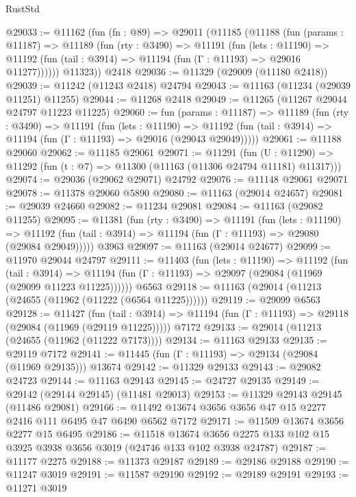 \begin{lexlean}{RustStd}
\begin{coremodule}
@29033 := @11162
    (fun (fn : @89) =>
    @29011
      (@11185
        (@11188
          (fun (params : @11187) =>
          @11189
            (fun (rty : @3490) =>
            @11191
              (fun (lets : @11190) =>
              @11192 (fun (tail : @3914) => @11194 (fun (Γ : @11193) => @29016 @11277))))))
        @11323))
    @2418
@29036 := @11329 (@29009 (@11180 @2418))
@29039 := @11242 (@11243 @2418) @24794
@29043 := @11163 (@11234 (@29039 @11251) @11255)
@29044 := @11268 @2418
@29049 := @11265 (@11267 @29044 @24797 @11223 @11225)
@29060 := fun (params : @11187) =>
  @11189
    (fun (rty : @3490) =>
    @11191
      (fun (lets : @11190) =>
      @11192 (fun (tail : @3914) => @11194 (fun (Γ : @11193) => @29016 (@29043 @29049)))))
@29061 := @11188 @29060
@29062 := @11185 @29061
@29071 := @11291
    (fun (U : @11290) => @11292 (fun (t : @7) => @11300 (@11163 (@11306 @24794 @11181) @11317)))
@29074 := @29036 (@29062 @29071) @24792
@29076 := @11148 @29061 @29071
@29078 := @11378 @29060 @5890
@29080 := @11163 (@29014 @24657)
@29081 := @29039 @24660
@29082 := @11234 @29081
@29084 := @11163 (@29082 @11255)
@29095 := @11381
    (fun (rty : @3490) =>
    @11191
      (fun (lets : @11190) =>
      @11192 (fun (tail : @3914) => @11194 (fun (Γ : @11193) => @29080 (@29084 @29049)))))
    @3963
@29097 := @11163 (@29014 @24677)
@29099 := @11970 @29044 @24797
@29111 := @11403
    (fun (lets : @11190) =>
    @11192
      (fun (tail : @3914) =>
      @11194 (fun (Γ : @11193) => @29097 (@29084 (@11969 (@29099 @11223 @11225))))))
    @6563
@29118 := @11163 (@29014 (@11213 (@24655 (@11962 (@11222 (@6564 @11225))))))
@29119 := @29099 @6563
@29128 := @11427
    (fun (tail : @3914) => @11194 (fun (Γ : @11193) => @29118 (@29084 (@11969 (@29119 @11225)))))
    @7172
@29133 := @29014 (@11213 (@24655 (@11962 (@11222 @7173))))
@29134 := @11163 @29133
@29135 := @29119 @7172
@29141 := @11445 (fun (Γ : @11193) => @29134 (@29084 (@11969 @29135))) @13674
@29142 := @11329 @29133
@29143 := @29082 @24723
@29144 := @11163 @29143
@29145 := @24727 @29135
@29149 := @29142 (@29144 @29145) (@11481 @29013)
@29153 := @11329 @29143 @29145 (@11486 @29081)
@29166 := @11492 @13674 @3656 @3656 @47 @15 @2277 @2416 @111 @6495 @47 @6490 @6562 @7172
@29171 := @11509 @13674 @3656 @2277 @15 @6495
@29186 := @11518
    @13674
    @3656
    @2275
    @133
    @102
    @15
    @3925
    @3938
    @3656
    @3019
    (@24746 @133 @102 @3938 @24787)
@29187 := @11177 @2275
@29188 := @11373 @29187
@29189 := @29186 @29188
@29190 := @11247 @3019
@29191 := @11587 @29190
@29192 := @29189 @29191
@29193 := @11271 @3019

\end{coremodule}
\end{lexlean}
